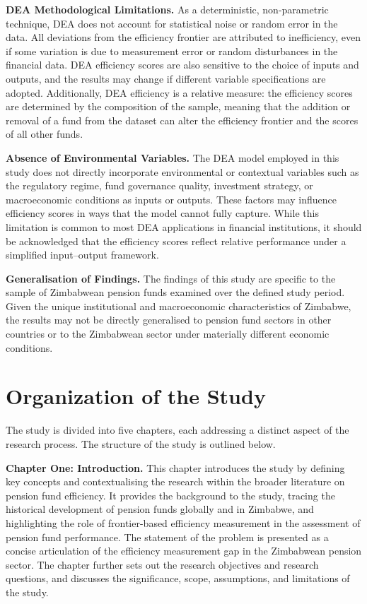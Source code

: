 \documentclass[12pt,a4paper]{article}
\begin{document}
\textbf{DEA Methodological Limitations.} As a deterministic, non-parametric technique, DEA does not account for statistical noise or random error in the data. All deviations from the efficiency frontier are attributed to inefficiency, even if some variation is due to measurement error or random disturbances in the financial data. DEA efficiency scores are also sensitive to the choice of inputs and outputs, and the results may change if different variable specifications are adopted. Additionally, DEA efficiency is a relative measure: the efficiency scores are determined by the composition of the sample, meaning that the addition or removal of a fund from the dataset can alter the efficiency frontier and the scores of all other funds.

\textbf{Absence of Environmental Variables.} The DEA model employed in this study does not directly incorporate environmental or contextual variables such as the regulatory regime, fund governance quality, investment strategy, or macroeconomic conditions as inputs or outputs. These factors may influence efficiency scores in ways that the model cannot fully capture. While this limitation is common to most DEA applications in financial institutions, it should be acknowledged that the efficiency scores reflect relative performance under a simplified input--output framework.

\textbf{Generalisation of Findings.} The findings of this study are specific to the sample of Zimbabwean pension funds examined over the defined study period. Given the unique institutional and macroeconomic characteristics of Zimbabwe, the results may not be directly generalised to pension fund sectors in other countries or to the Zimbabwean sector under materially different economic conditions.

\section{Organization of the Study}

The study is divided into five chapters, each addressing a distinct aspect of the research process. The structure of the study is outlined below.

\textbf{Chapter One: Introduction.} This chapter introduces the study by defining key concepts and contextualising the research within the broader literature on pension fund efficiency. It provides the background to the study, tracing the historical development of pension funds globally and in Zimbabwe, and highlighting the role of frontier-based efficiency measurement in the assessment of pension fund performance. The statement of the problem is presented as a concise articulation of the efficiency measurement gap in the Zimbabwean pension sector. The chapter further sets out the research objectives and research questions, and discusses the significance, scope, assumptions, and limitations of the study.
\end{document}
